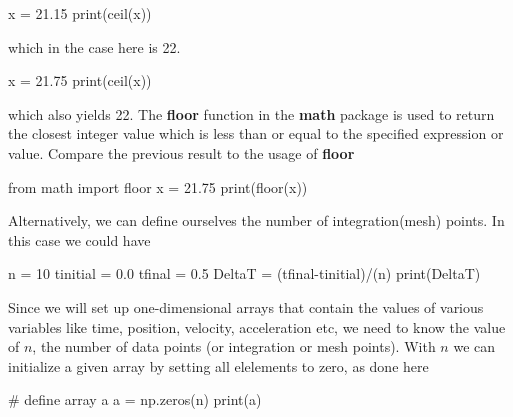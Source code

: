 \documentclass[%
oneside,                 %
final,                   %
10pt]{article}
\begin{document}
\bpycod
x = 21.15
print(ceil(x))

\epycod

which in the case here is 22.



\bpycod
x = 21.75
print(ceil(x))

\epycod

which also yields 22. The  \textbf{floor} function in the \textbf{math} package
is used to return the closest integer value which is less than or equal to the specified expression or value.
Compare the previous result to the usage of \textbf{floor}




\bpycod
from math import floor
x = 21.75
print(floor(x))

\epycod


Alternatively, we can define ourselves the number of integration(mesh) points. In this case we could have






\bpycod
n = 10
tinitial = 0.0
tfinal = 0.5
DeltaT = (tfinal-tinitial)/(n)
print(DeltaT)

\epycod


Since we will set up one-dimensional arrays that contain the values of
various variables like time, position, velocity, acceleration etc, we
need to know the value of $n$, the number of data points (or
integration or mesh points).  With $n$ we can initialize a given array
by setting all elelements to zero, as done here





\bpycod
# define array a
a = np.zeros(n)
print(a)

\epycod


\end{document}
